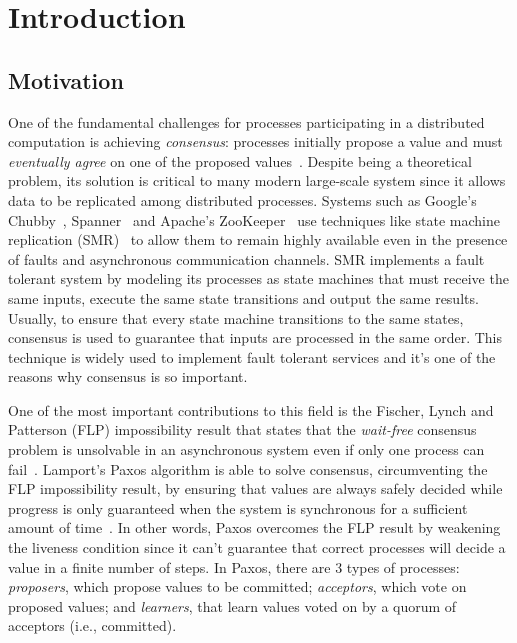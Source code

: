 
\chapter{Introduction}
\section{Motivation}
One of the fundamental challenges for processes participating in a distributed computation is achieving \emph{consensus}: processes initially propose a value and must \emph{eventually agree} on one of the proposed values~\cite{FLP85}. Despite being a theoretical problem, its solution is critical to many modern large-scale system since it allows data to be replicated among distributed processes. Systems such as Google's Chubby~\cite{Burrows2006}, Spanner~\cite{Corbett2012} and Apache's ZooKeeper~\cite{Junqueira2011} use techniques like state machine replication (SMR)~\cite{time-clocks,Schneider1990} to allow them to remain highly available even in the presence of faults and asynchronous communication channels. SMR implements a fault tolerant system by modeling its processes as state machines that must receive the same inputs, execute the same state transitions and output the same results. Usually, to ensure that every state machine transitions to the same states, consensus is used to guarantee that inputs are processed in the same order. This technique is widely used to implement fault tolerant services and it's one of the reasons why consensus is so important.\par
One of the most important contributions to this field is the Fischer, Lynch and Patterson (FLP) impossibility result that states that the \textit{wait-free} consensus problem is unsolvable in an asynchronous system even if only one process can fail~\cite{Fischer1985}. Lamport's Paxos algorithm is able to solve consensus, circumventing the FLP impossibility result, by ensuring that values are always safely decided while progress is only guaranteed when the system is synchronous for a sufficient amount of time~\cite{Lamport2001}. In other words, Paxos overcomes the FLP result by weakening the liveness condition since it can't guarantee that correct processes will decide a value in a finite number of steps. In Paxos, there are 3 types of processes: \textit{proposers}, which propose values to be committed; \textit{acceptors}, which vote on proposed values; and \textit{learners}, that learn values voted on by a quorum of acceptors (i.e., committed).\par
